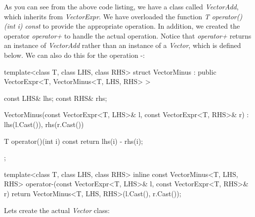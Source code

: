 \documentclass[12pt,a4paper]{article}
\begin{document}
As you can see from the above code listing, we have a class called \textit{VectorAdd}, which inherits from \textit{VectorExpr}. We have overloaded the function \textit{T operator()(int i) const} to provide the appropriate operation. In addition, we created the operator \textit{operator+} to handle the actual operation. Notice that \textit{operator+} returns an instance of \textit{VectorAdd} rather than an instance of a \textit{Vector}, which is defined below. We can also do this for the operation -:
\begin{cppsource}

template<class T, class LHS, class RHS>
struct VectorMinus : public VectorExpr<T, VectorMinus<T, LHS, RHS> > {
    const LHS& lhs;
    const RHS& rhs;

    VectorMinus(const VectorExpr<T, LHS>& l,
            const VectorExpr<T, RHS>& r)
    : lhs(l.Cast()), rhs(r.Cast()) {
    }

    T operator()(int i) const {
        return lhs(i) - rhs(i);
    }

};

template<class T, class LHS, class RHS>
inline const VectorMinus<T, LHS, RHS> operator-(const VectorExpr<T, LHS>& l, 
const VectorExpr<T, RHS>& r) {
    return VectorMinus<T, LHS, RHS>(l.Cast(), r.Cast());
}

\end{cppsource}

Lets create the actual \textit{Vector} class:
\end{document}
